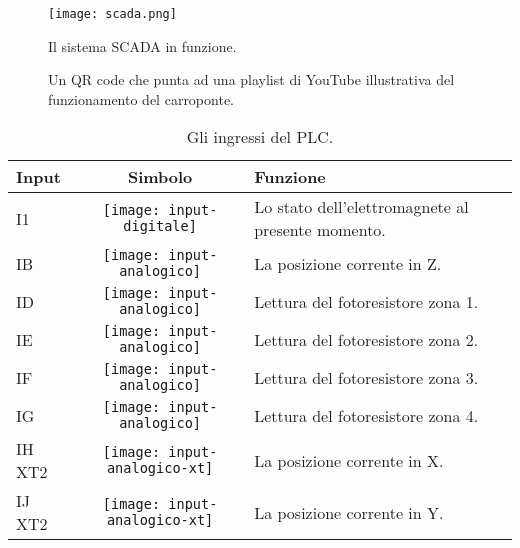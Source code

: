 \begin{figure}[htbp]\centering
    \caption{Il sistema SCADA in funzione.}
    \texttt{[image: scada.png]}
\end{figure}

\begin{figure}[htbp]\centering
    \caption{Un QR code che punta ad una playlist di YouTube illustrativa del funzionamento del carroponte.}
\end{figure}


\begin{table}[htbp]\centering
    \caption{Gli ingressi del PLC.}
    \begin{tabularx}{\columnwidth}{@{}lcX@{}}\toprule
        \textbf{Input} & \textbf{Simbolo}                                 & \textbf{Funzione}                                 \\ \midrule
        I1             & \texttt{[image: input-digitale]}     & Lo stato dell'elettromagnete al presente momento. \\
        IB             & \texttt{[image: input-analogico]}    & La posizione corrente in Z.                       \\
        ID             & \texttt{[image: input-analogico]}    & Lettura del fotoresistore zona 1.                 \\
        IE             & \texttt{[image: input-analogico]}    & Lettura del fotoresistore zona 2.                 \\
        IF             & \texttt{[image: input-analogico]}    & Lettura del fotoresistore zona 3.                 \\
        IG             & \texttt{[image: input-analogico]}    & Lettura del fotoresistore zona 4.                 \\
        IH XT2         & \texttt{[image: input-analogico-xt]} & La posizione corrente in X.                       \\
        IJ XT2         & \texttt{[image: input-analogico-xt]} & La posizione corrente in Y.                       \\
    \bottomrule\end{tabularx}
\end{table}

